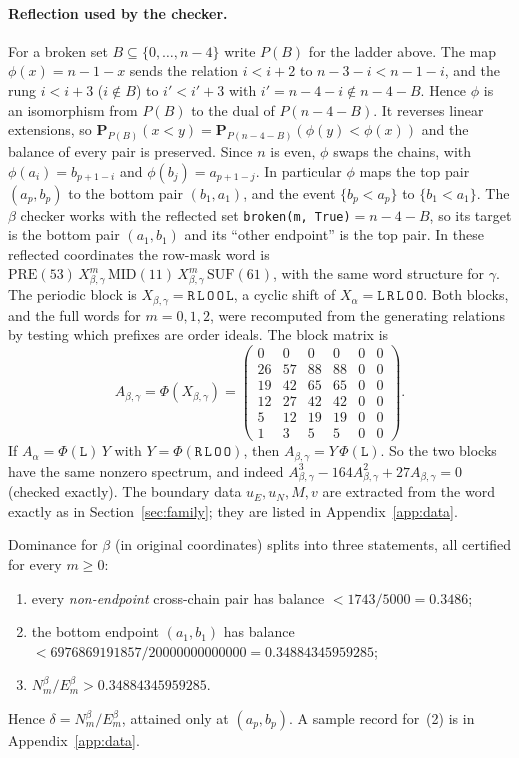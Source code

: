 \documentclass[11pt]{amsart}
\theoremstyle{definition}
\theoremstyle{remark}
\newcommand{\Prob}{\mathbf{P}}
\newcommand{\mk}[1]{\mathtt{#1}}
\begin{document}
\paragraph{Reflection used by the checker.} For a broken set $B\subseteq\{0,\dots,n-4\}$ write $P(B)$ for the ladder above. The map $\phi(x)=n-1-x$ sends the relation $i<i+2$ to $n-3-i<n-1-i$, and the rung $i<i+3$ ($i\notin B$) to $i'<i'+3$ with $i'=n-4-i\notin n-4-B$. Hence $\phi$ is an isomorphism from $P(B)$ to the dual of $P(n-4-B)$. It reverses linear extensions, so $\Prob_{P(B)}(x<y)=\Prob_{P(n-4-B)}(\phi(y)<\phi(x))$ and the balance of every pair is preserved. Since $n$ is even, $\phi$ swaps the chains, with $\phi(a_i)=b_{p+1-i}$ and $\phi(b_j)=a_{p+1-j}$. In particular $\phi$ maps the top pair $(a_p,b_p)$ to the bottom pair $(b_1,a_1)$, and the event $\{b_p<a_p\}$ to $\{b_1<a_1\}$. The $\beta$ checker works with the reflected set \texttt{broken(m, True)}${}=n-4-B$, so its target is the bottom pair $(a_1,b_1)$ and its ``other endpoint'' is the top pair. In these reflected coordinates the row-mask word is $\mathrm{PRE}(53)\,X_{\beta,\gamma}^m\,\mathrm{MID}(11)\,X_{\beta,\gamma}^m\,\mathrm{SUF}(61)$, with the same word structure for $\gamma$. The periodic block is $X_{\beta,\gamma}=\mk{R}\,\mk{L}\,\mk{O}\,\mk{O}\,\mk{L}$, a cyclic shift of $X_\alpha=\mk{L}\,\mk{R}\,\mk{L}\,\mk{O}\,\mk{O}$. Both blocks, and the full words for $m=0,1,2$, were recomputed from the generating relations by testing which prefixes are order ideals. The block matrix is
\[
A_{\beta,\gamma}=\Phi(X_{\beta,\gamma})=\begin{pmatrix}
0&0&0&0&0&0\\ 26&57&88&88&0&0\\ 19&42&65&65&0&0\\ 12&27&42&42&0&0\\ 5&12&19&19&0&0\\ 1&3&5&5&0&0
\end{pmatrix}.
\]
If $A_\alpha=\Phi(\mk{L})\,Y$ with $Y=\Phi(\mk{R}\,\mk{L}\,\mk{O}\,\mk{O})$, then $A_{\beta,\gamma}=Y\,\Phi(\mk{L})$. So the two blocks have the same nonzero spectrum, and indeed $A_{\beta,\gamma}^3-164A_{\beta,\gamma}^2+27A_{\beta,\gamma}=0$ (checked exactly). The boundary data $u_E,u_N,M,v$ are extracted from the word exactly as in Section~\ref{sec:family}; they are listed in Appendix~\ref{app:data}.

Dominance for $\beta$ (in original coordinates) splits into three statements, all certified for every $m\ge0$:
\begin{enumerate}
\item every \emph{non-endpoint} cross-chain pair has balance $<1743/5000=0.3486$;
\item the bottom endpoint $(a_1,b_1)$ has balance $<6976869191857/20000000000000=0.34884345959285$;
\item $N_m^{\beta}/E_m^{\beta}>0.34884345959285$.
\end{enumerate}
Hence $\delta=N_m^{\beta}/E_m^{\beta}$, attained only at $(a_p,b_p)$. A sample record for~(2) is in Appendix~\ref{app:data}.
\end{document}
